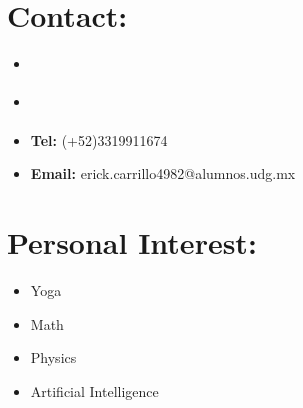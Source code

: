 \documentclass{article}
\begin{document}
\begin{minipage}[t]{8cm}
\begin{itemize}
\end{itemize}
\section*{Contact:}
    \begin{itemize}
        \setlength\itemsep{0.01cm}
        \item \href{https://www.linkedin.com/in/erick-alejandro-carrillo-lopez-988112219/}{\color{Blue}{Linkedin}}
        \item \href{https://github.com/alecksandr26}{\color{Blue}{GitHub}}
        \item \textbf{Tel:} (+52)3319911674
        \item \textbf{Email:} erick.carrillo4982@alumnos.udg.mx
    \end{itemize}
    \section*{Personal Interest:}
    \begin{itemize}
        \item Yoga
        \item Math
        \item Physics
        \item Artificial Intelligence
    \end{itemize}


  
    
\end{minipage}
\space
\space
\space
\space
\space
\end{document}
